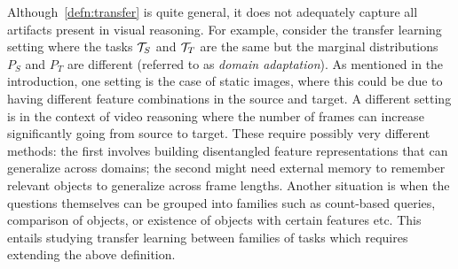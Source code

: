 Although~\cref{defn:transfer} is quite general, it does not adequately capture all artifacts present in visual reasoning.
For example, consider the transfer learning setting where the tasks $\mathcal{T}_S$ and $\mathcal{T}_T$ are the same
but the marginal distributions $P_S$ and $P_T$ are different (referred to as \emph{domain adaptation}).
As mentioned in the introduction, one setting is the case of static images,
where this could be due to having different feature combinations in the source and target.
A different setting is in the context of video reasoning where the number of frames can increase significantly going from source to target.
These require possibly very different methods: the first involves building disentangled feature representations that can generalize across
domains; the second might need external memory to remember relevant objects to generalize across frame lengths.
Another situation is when the questions themselves can be grouped into families such as count-based queries,
comparison of objects, or existence of objects with certain features etc.
This entails studying transfer learning between families of tasks which requires extending the above definition.

